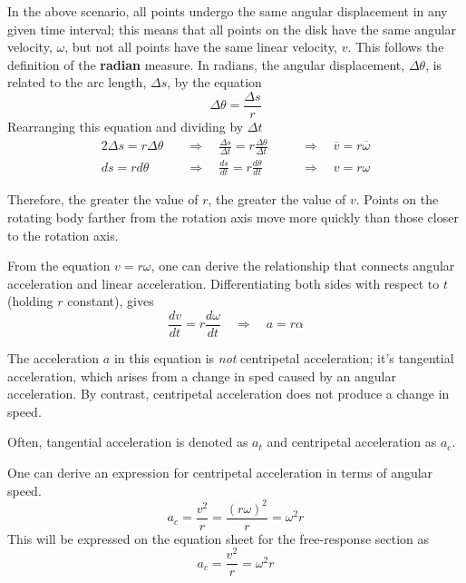 \documentclass{article}
\begin{document}
In the above scenario, all points undergo the same angular displacement in any given time interval; this means that all points on the disk have the same angular velocity, $\omega$, but not all points have the same linear velocity, $v$.
This follows the definition of the \textbf{radian} measure. In radians, the angular displacement, $\Delta \theta$, is related to the arc length, $\Delta s$, by the equation
\begin{equation*}
    \Delta \theta = \frac{\Delta s}{r}
\end{equation*}
Rearranging this equation and dividing by $\Delta t$
\begin{alignat*}{2}
    \Delta s = r \Delta \theta &\quad \Rightarrow \quad \frac{\Delta s}{\Delta t} = r\frac{\Delta \theta}{\Delta t} &&\quad \Rightarrow \quad \overline{v} = r \overline{\omega} \\
    ds = rd\theta &\quad \Rightarrow \quad \frac{ds}{dt} = r \frac{d\theta}{dt} &&\quad \Rightarrow \quad v=r\omega
\end{alignat*}

Therefore, the greater the value of $r$, the greater the value of $v$. Points on the rotating body farther from the rotation axis move more quickly than those closer to the rotation axis.

From the equation $v = r\omega$, one can derive the relationship that connects angular acceleration and linear acceleration. Differentiating both sides with respect to $t$ (holding $r$ constant), gives
\begin{equation*}
    \frac{dv}{dt} = r \frac{d\omega}{dt} \quad \Rightarrow \quad a=r\alpha
\end{equation*}
\begin{note}
    The acceleration $a$ in this equation is \textit{not} centripetal acceleration; it's tangential acceleration, which arises from a change in sped caused by an angular acceleration. By contrast, centripetal acceleration does not produce a change in speed.

    Often, tangential acceleration is denoted as $a_{t}$ and centripetal acceleration as $a_{c}$.
\end{note}
\begin{note}
    One can derive an expression for centripetal acceleration in terms of angular speed.
    \begin{equation*}
        a_{c} = \frac{v^{2}}{r} = \frac{(r\omega)^{2}}{r}=\omega^{2}r
    \end{equation*}
    This will be expressed on the equation sheet for the free-response section as
    \begin{equation*}
        a_{c} = \frac{v^{2}}{r}=\omega^{2}r
    \end{equation*}
\end{note}
\end{document}
